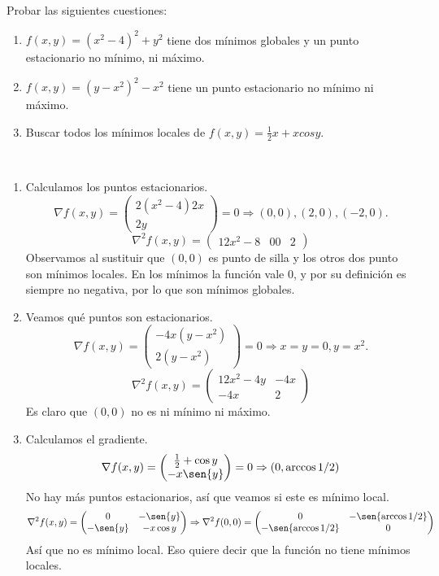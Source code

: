 \documentclass[twoside]{article}
\begin{document}
\begin{ejercicio}{8}
Probar las siguientes cuestiones:
\begin{enumerate}
\item $f(x,y)=(x^2-4)^2+y^2$ tiene dos mínimos globales y un punto estacionario no mínimo, ni máximo.
\item $f(x,y)=(y-x^2)^2-x^2$ tiene un punto estacionario no mínimo ni máximo.
\item Buscar todos los mínimos locales de $f(x,y)=\frac{1}{2}x+xcosy$.
\end{enumerate}

\begin{solucion}\
\begin{enumerate}
\item Calculamos los puntos estacionarios.
$$\nabla f(x,y)=\begin{pmatrix}
2(x^2-4)2x\\
2y
\end{pmatrix}=0\Rightarrow (0,0),(2,0),(-2,0).$$
$$\nabla^2 f(x,y)=\begin{pmatrix}
12x^2-8 & 0
0 & 2
\end{pmatrix}$$
Observamos al sustituir que $(0,0)$ es punto de silla y los otros dos punto son mínimos locales. En los mínimos la función vale 0, y por su definición es siempre no negativa, por lo que son mínimos globales.
\item Veamos qué puntos son estacionarios.
$$\nabla f(x,y)=\begin{pmatrix}
-4x(y-x^2)\\
2(y-x^2)
\end{pmatrix}=0\Rightarrow x=y=0, y=x^2.$$
$$\nabla^2 f(x,y)=\begin{pmatrix}
12x^2-4y & -4x\\
-4x & 2
\end{pmatrix}$$
Es claro que $(0,0)$ no es ni mínimo ni máximo. 
\item Calculamos el gradiente. $$\nabla f(x,y)=\begin{pmatrix}
\frac{1}{2}+\cos{y}\\
-x\sen{y}
\end{pmatrix}=0\Rightarrow (0,\arccos{1/2})$$
No hay más puntos estacionarios, así que veamos si este es mínimo local.
$$\nabla^2 f(x,y)=\begin{pmatrix}
0 & -\sen{y}\\
-\sen{y} & -x\cos{y}
\end{pmatrix}\Rightarrow \nabla^2f(0,0)=\begin{pmatrix}
0 & -\sen{\arccos{1/2}}\\
-\sen{\arccos{1/2}} & 0
\end{pmatrix}$$
Así que no es mínimo local. Eso quiere decir que la función no tiene mínimos locales. 
\end{enumerate}
\end{solucion}
\end{ejercicio}
\end{document}
